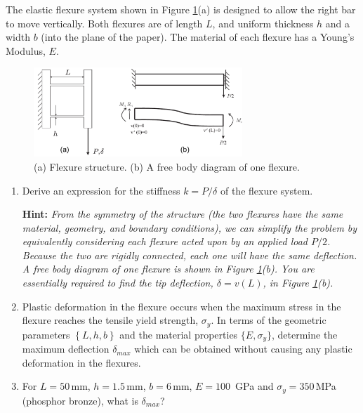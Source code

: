 \documentclass[11pt]{article}
\begin{document}
The elastic flexure system shown in Figure \ref{fig_2005_002}(a) is designed to allow the right bar to move vertically. %
Both flexures are of length $L$, and uniform thickness $h$ and a
width $b$ (into the plane of the paper). The material of each
flexure has a Young's Modulus, $E$.

\begin{figure}[h!]
\centering
\includegraphics[width=0.7\textwidth]{Flexure_structure_with_hints}
\caption{(a) Flexure structure. (b)  A free body diagram of one flexure.}
\label{fig_2005_002}
\end{figure}

\begin{enumerate}

\item Derive an expression for the  stiffness $k= {P}/{\delta}$ of the flexure
system.

\textbf{Hint:} {\em From the symmetry of the structure (the two flexures have the same material, geometry, and boundary conditions), we can simplify the problem by equivalently considering each flexure acted upon by an applied load $P/2$. Because the two are rigidly connected, each one will have the same deflection. A free body diagram of one flexure is shown in Figure \ref{fig_2005_002}(b). You are essentially required to find the tip deflection, $\delta = v(L)$, in Figure \ref{fig_2005_002}(b).}

\item Plastic deformation in the flexure occurs when the
maximum stress in the flexure reaches the tensile yield strength,
$\sigma_y$. In terms of the geometric parameters $\left\{L,h,b\right\}$ and the
material properties $\{ E, \sigma_y\}$, determine the maximum
deflection $\delta_{max}$ which can be obtained without causing any
plastic deformation in the flexures.

\item For $L=50$\,mm, $h=1.5$\,mm, $b=6$\,mm, $E=100$\, GPa and
$\sigma_y=350$\,MPa (phosphor bronze), what is $\delta_{max}$?
\end{enumerate}
\end{document}
